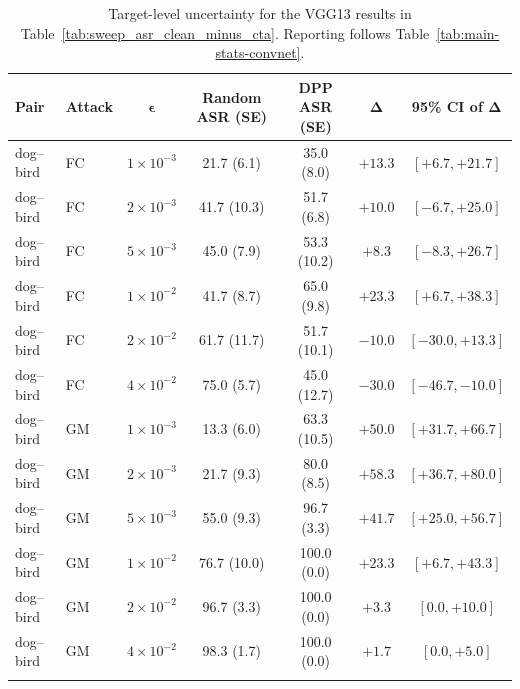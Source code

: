 
\begin{table}[p]
\centering
\caption{
Target-level uncertainty for the VGG13 results in
Table~\ref{tab:sweep_asr_clean_minus_cta}. Reporting follows
Table~\ref{tab:main-stats-convnet}.
}
\label{tab:main-stats-vgg}
\scriptsize
\setlength{\tabcolsep}{5pt}
\renewcommand{\arraystretch}{1.08}
\begin{tabular}{llccccc}
\toprule
\textbf{Pair} &
\textbf{Attack} &
$\boldsymbol{\epsilon}$ &
\textbf{Random ASR (SE)} &
\textbf{DPP ASR (SE)} &
$\boldsymbol{\Delta}$ &
\textbf{95\% CI of $\boldsymbol{\Delta}$} \\
\midrule

dog--bird & FC & $1{\times}10^{-3}$ & 21.7 (6.1) & 35.0 (8.0) & $+13.3$ & $[+6.7, +21.7]$ \\
dog--bird & FC & $2{\times}10^{-3}$ & 41.7 (10.3) & 51.7 (6.8) & $+10.0$ & $[-6.7, +25.0]$ \\
dog--bird & FC & $5{\times}10^{-3}$ & 45.0 (7.9) & 53.3 (10.2) & $+8.3$ & $[-8.3, +26.7]$ \\
dog--bird & FC & $1{\times}10^{-2}$ & 41.7 (8.7) & 65.0 (9.8) & $+23.3$ & $[+6.7, +38.3]$ \\
dog--bird & FC & $2{\times}10^{-2}$ & 61.7 (11.7) & 51.7 (10.1) & $-10.0$ & $[-30.0, +13.3]$ \\
dog--bird & FC & $4{\times}10^{-2}$ & 75.0 (5.7) & 45.0 (12.7) & $-30.0$ & $[-46.7, -10.0]$ \\
\addlinespace[2pt]

dog--bird & GM & $1{\times}10^{-3}$ & 13.3 (6.0) & 63.3 (10.5) & $+50.0$ & $[+31.7, +66.7]$ \\
dog--bird & GM & $2{\times}10^{-3}$ & 21.7 (9.3) & 80.0 (8.5) & $+58.3$ & $[+36.7, +80.0]$ \\
dog--bird & GM & $5{\times}10^{-3}$ & 55.0 (9.3) & 96.7 (3.3) & $+41.7$ & $[+25.0, +56.7]$ \\
dog--bird & GM & $1{\times}10^{-2}$ & 76.7 (10.0) & 100.0 (0.0) & $+23.3$ & $[+6.7, +43.3]$ \\
dog--bird & GM & $2{\times}10^{-2}$ & 96.7 (3.3) & 100.0 (0.0) & $+3.3$ & $[0.0, +10.0]$ \\
dog--bird & GM & $4{\times}10^{-2}$ & 98.3 (1.7) & 100.0 (0.0) & $+1.7$ & $[0.0, +5.0]$ \\
\addlinespace[2pt]


\end{tabular}
\end{table}
